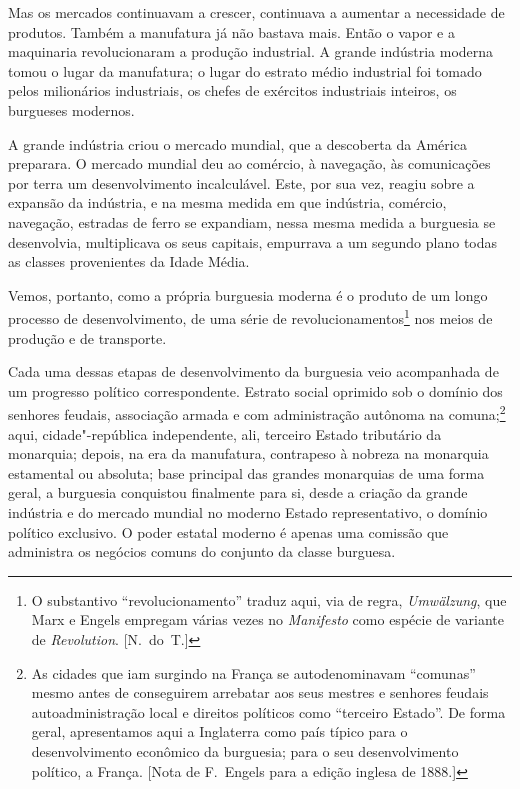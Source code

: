 Mas os mercados continuavam a crescer, continuava a aumentar a
necessidade de produtos. Também a manufatura já não bastava mais. Então
o vapor e a maquinaria revolucionaram a produção industrial. A grande
indústria moderna tomou o lugar da manufatura; o lugar do estrato médio
industrial foi tomado pelos milionários industriais, os chefes de
exércitos industriais inteiros, os burgueses modernos.

A grande indústria criou o mercado mundial, que a descoberta da América
preparara. O mercado mundial deu ao comércio, à navegação, às
comunicações por terra um desenvolvimento incalculável. Este, por sua
vez, reagiu sobre a expansão da indústria, e na mesma medida em que
indústria, comércio, navegação, estradas de ferro se expandiam, nessa
mesma medida a burguesia se desenvolvia, multiplicava os seus capitais,
empurrava a um segundo plano todas as classes provenientes da Idade
Média.

Vemos, portanto, como a própria burguesia moderna é o produto de
um longo processo de desenvolvimento, de uma série de 
revolucionamentos\footnote{ O substantivo ``revolucionamento'' traduz aqui, via de regra, \textit{Umwälzung}, que Marx e Engels empregam várias vezes no
\textit{Manifesto} como espécie de variante de \textit{Revolution}. [N.~do~T.]} nos meios de produção e de transporte.

Cada uma dessas etapas de desenvolvimento da burguesia veio
acompanhada de um progresso político correspondente. Estrato social
oprimido sob o domínio dos senhores feudais, associação armada e com
administração autônoma na comuna;\footnote{ As cidades que iam surgindo na 
França se autodenominavam ``comunas'' mesmo antes de conseguirem arrebatar aos
seus mestres e senhores feudais autoadministração local e direitos políticos 
como ``terceiro Estado''. De forma geral, apresentamos aqui a Inglaterra
como país típico para o desenvolvimento econômico da burguesia; para o seu 
desenvolvimento político, a França. [Nota de F.~Engels para a edição inglesa 
de 1888.]} aqui, cidade"-república independente, ali, terceiro Estado
tributário da monarquia; depois, na era da manufatura, contrapeso à
nobreza na monarquia estamental ou absoluta; base principal das grandes
monarquias de uma forma geral, a burguesia conquistou finalmente para
si, desde a criação da grande indústria e do mercado mundial no moderno
Estado representativo, o domínio político exclusivo. O poder estatal
moderno é apenas uma comissão que administra os negócios comuns do
conjunto da classe burguesa.


